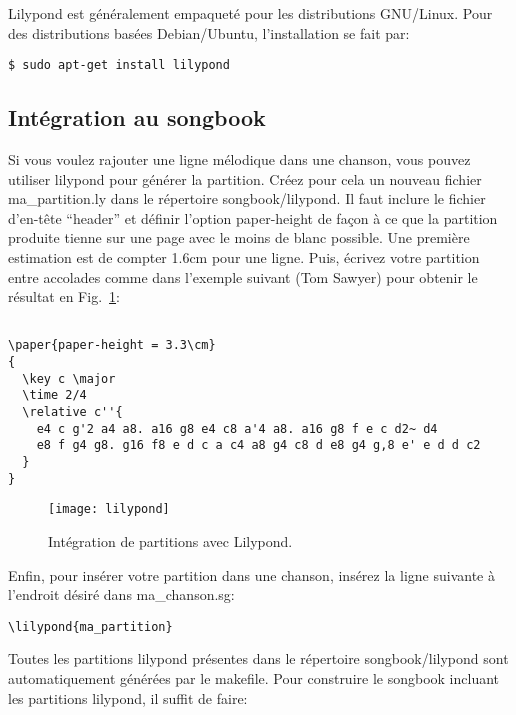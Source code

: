 \documentclass[a4paper]{article}
\begin{document}
Lilypond est généralement empaqueté pour les distributions
GNU/Linux. Pour des distributions basées Debian/Ubuntu, l'installation
se fait par:

\begin{verbatim}
$ sudo apt-get install lilypond
\end{verbatim}


\subsection{Intégration au songbook}

Si vous voulez rajouter une ligne mélodique dans une chanson, vous
pouvez utiliser lilypond pour générer la partition. Créez pour cela un
nouveau fichier ma\_partition.ly dans le répertoire songbook/lilypond.
Il faut inclure le fichier d'en-tête ``header'' et définir l'option
paper-height de façon à ce que la partition produite tienne sur une
page avec le moins de blanc possible. Une première estimation est de
compter 1.6cm pour une ligne. Puis, écrivez votre partition entre
accolades comme dans l'exemple suivant (Tom Sawyer) pour obtenir le
résultat en Fig.~\ref{fig:lilypond}:

\begin{verbatim}

\paper{paper-height = 3.3\cm}
{
  \key c \major
  \time 2/4
  \relative c''{
    e4 c g'2 a4 a8. a16 g8 e4 c8 a'4 a8. a16 g8 f e c d2~ d4
    e8 f g4 g8. g16 f8 e d c a c4 a8 g4 c8 d e8 g4 g,8 e' e d d c2
  }
}
\end{verbatim}

\begin{figure}
  \centering
  \texttt{[image: lilypond]}
  \caption{Intégration de partitions avec Lilypond.}
  \label{fig:lilypond}
\end{figure}

Enfin, pour insérer votre partition dans une chanson, insérez la ligne
suivante à l'endroit désiré dans ma\_chanson.sg:

\begin{verbatim}
\lilypond{ma_partition}
\end{verbatim}

Toutes les partitions lilypond présentes dans le répertoire
songbook/lilypond sont automatiquement générées par le makefile. Pour
construire le songbook incluant les partitions lilypond, il suffit de
faire:
\end{document}
